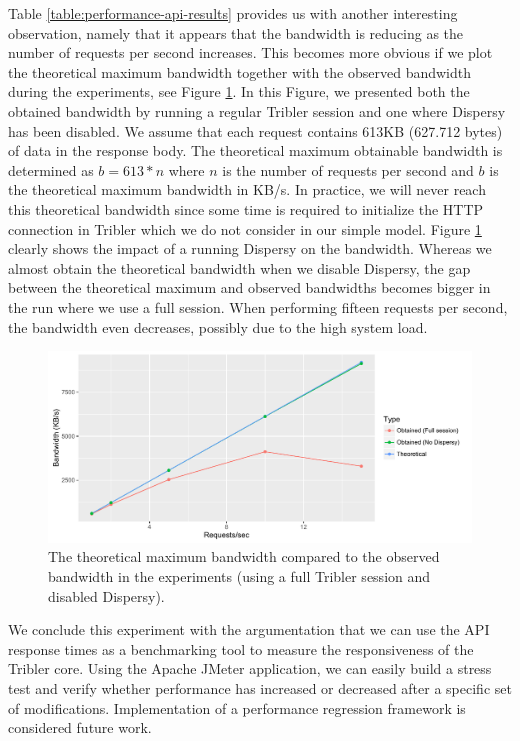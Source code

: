 Table \ref{table:performance-api-results} provides us with another interesting observation, namely that it appears that the bandwidth is reducing as the number of requests per second increases. This becomes more obvious if we plot the theoretical maximum bandwidth together with the observed bandwidth during the experiments, see Figure \ref{fig:api-bandwidth-performance}. In this Figure, we presented both the obtained bandwidth by running a regular Tribler session and one where Dispersy has been disabled. We assume that each request contains 613KB (627.712 bytes) of data in the response body. The theoretical maximum obtainable bandwidth is determined as $ b = 613 * n $ where $ n $ is the number of requests per second and $ b $ is the theoretical maximum bandwidth in KB/s. In practice, we will never reach this theoretical bandwidth since some time is required to initialize the HTTP connection in Tribler which we do not consider in our simple model. Figure \ref{fig:api-bandwidth-performance} clearly shows the impact of a running Dispersy on the bandwidth. Whereas we almost obtain the theoretical bandwidth when we disable Dispersy, the gap between the theoretical maximum and observed bandwidths becomes bigger in the run where we use a full session. When performing fifteen requests per second, the bandwidth even decreases, possibly due to the high system load.\\

\begin{figure}[h!]
	\centering
	\includegraphics[width=1.0\columnwidth]{images/experiments/api_bandwidth_performance}
	\caption{The theoretical maximum bandwidth compared to the observed bandwidth in the experiments (using a full Tribler session and disabled Dispersy).}
	\label{fig:api-bandwidth-performance}
\end{figure}

We conclude this experiment with the argumentation that we can use the API response times as a benchmarking tool to measure the responsiveness of the Tribler core. Using the Apache JMeter application, we can easily build a stress test and verify whether performance has increased or decreased after a specific set of modifications. Implementation of a performance regression framework is considered future work. 

